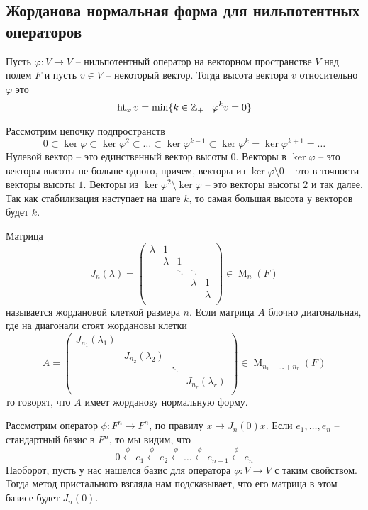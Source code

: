 \subsection{Жорданова нормальная форма для нильпотентных операторов}

\begin{definition}
Пусть $\varphi \colon V\to V$ -- нильпотентный оператор на векторном пространстве $V$ над полем $F$ и пусть $v\in V$ -- некоторый вектор.
Тогда высота вектора $v$ относительно $\varphi$ это 
\[
\operatorname{ht}_\varphi v = \min\{k\in \mathbb Z_+ \mid \varphi^k v = 0\}
\]
\end{definition}

Рассмотрим цепочку подпространств
\[
0\subset \ker \varphi \subset \ker \varphi^2 \subset \ldots \subset \ker \varphi^{k-1} \subset \ker \varphi^k = \ker \varphi^{k+1} = \ldots
\]
Нулевой вектор -- это единственный вектор высоты $0$.
Векторы в $\ker \varphi$ -- это векторы высоты не больше одного, причем, векторы из $\ker \varphi \setminus 0$ -- это в точности векторы высоты $1$.
Векторы из $\ker\varphi^2 \setminus \ker \varphi$ -- это векторы высоты $2$ и так далее.
Так как стабилизация наступает на шаге $k$, то самая большая высота у векторов будет $k$.

\begin{definition}
\label{def::JNF}
Матрица 
\[
J_n(\lambda) = 
\begin{pmatrix}
{\lambda}&{1}&{}&{}&{}\\
{}&{\lambda}&{1}&{}&{}\\
{}&{}&{\ddots}&{\ddots}&{}\\
{}&{}&{}&{\lambda}&{1}\\
{}&{}&{}&{}&{\lambda}\\
\end{pmatrix}
\in \operatorname{M}_n(F)
\]
называется жордановой клеткой размера $n$.
Если матрица $A$ блочно диагональная, где на диагонали стоят жордановы клетки
\[
A = 
\begin{pmatrix}
{J_{n_1}(\lambda_1)}&{}&{}&{}\\
{}&{J_{n_2}(\lambda_2)}&{}&{}\\
{}&{}&{\ddots}&{}\\
{}&{}&{}&{J_{n_r}(\lambda_r)}\\
\end{pmatrix}
\in \operatorname{M}_{n_1 + \ldots + n_r}(F)
\]
то говорят, что $A$ имеет жорданову нормальную форму.
\end{definition}

Рассмотрим оператор $\phi\colon F^n \to F^n$, по правилу $x\mapsto J_n(0)x$.
Если $e_1, \ldots ,e_n$ -- стандартный базис в $F^n$, то мы видим, что 
\[
0\stackrel{\phi}{\longleftarrow}e_1\stackrel{\phi}{\longleftarrow}e_2 \stackrel{\phi}{\longleftarrow}\ldots\stackrel{\phi}{\longleftarrow}e_{n-1}\stackrel{\phi}{\longleftarrow}e_n
\]
Наоборот, пусть у нас нашелся базис для оператора $\phi\colon V\to V$ с таким свойством.
Тогда метод пристального взгляда нам подсказывает, что его матрица в этом базисе будет $J_n(0)$.

